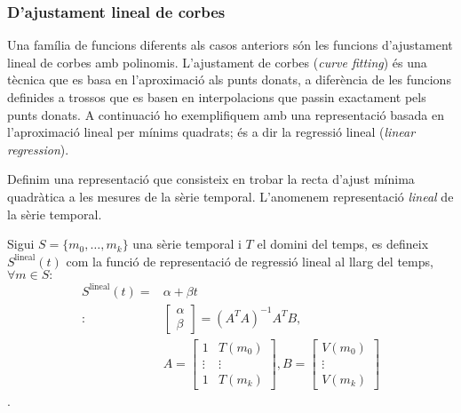 \subsubsection{D'ajustament lineal de corbes}

Una família de funcions diferents als casos anteriors són les funcions
d'ajustament lineal de corbes amb polinomis.  L'ajustament de corbes
(\emph{curve fitting}) és una tècnica que es basa en l'aproximació als
punts donats, a diferència de les funcions definides a trossos que es
basen en interpolacions que passin exactament pels punts donats.  A
continuació ho exemplifiquem amb una representació basada en
l'aproximació lineal per mínims quadrats; és a dir la regressió lineal
(\emph{linear regression}).


Definim una representació que consisteix en trobar la recta d'ajust
mínima quadràtica a les mesures de la sèrie temporal. L'anomenem
representació \emph{lineal} de la sèrie temporal.
\begin{definition}
  Sigui $S=\{m_0,\ldots,m_k\}$ una sèrie temporal i $T$ el domini del
  temps, es defineix $S^\text{lineal}(t)$ com la funció de
  representació de regressió lineal al llarg del temps, $\forall m \in
  S:$
  \begin{align*}
    S^\text{lineal}(t) = & \alpha + \beta t \\
    :\; & 
    \left[\begin{array}{c}
        \alpha \\
        \beta
      \end{array}\right] 
    = (A^TA)^{-1}A^TB, \\
    & A=\left[\begin{array}{cc}
        1 & T(m_0) \\
        \vdots & \vdots \\
        1 & T(m_k)
      \end{array}\right],
    B=\left[\begin{array}{c}
        V(m_0) \\
        \vdots \\
        V(m_k)
      \end{array}\right]       
   \end{align*}.
\end{definition}



